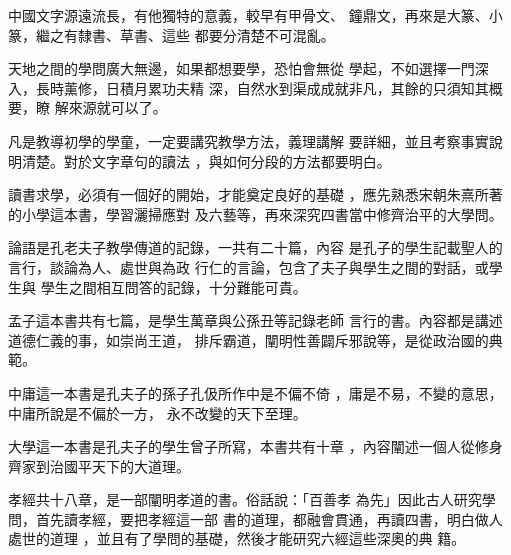\documentclass[avery5371,grid]{flashcards}
\begin{document}
{中國文字源遠流長，有他獨特的意義，較早有甲骨文、
鐘鼎文，再來是大篆、小篆，繼之有隸書、草書、這些
都要分清楚不可混亂。} %
{} %

{天地之間的學問廣大無邊，如果都想要學，恐怕會無從
學起，不如選擇一門深入，長時薰修，日積月累功夫精
深，自然水到渠成成就非凡，其餘的只須知其概要，瞭
解來源就可以了。} %
{} %

{凡是教導初學的學童，一定要講究教學方法，義理講解
要詳細，並且考察事實說明清楚。對於文字章句的讀法
，與如何分段的方法都要明白。} %
{} %

{讀書求學，必須有一個好的開始，才能奠定良好的基礎
，應先熟悉宋朝朱熹所著的小學這本書，學習灑掃應對
及六藝等，再來深究四書當中修齊治平的大學問。} %
{} %

{論語是孔老夫子教學傳道的記錄，一共有二十篇，內容
是孔子的學生記載聖人的言行，談論為人、處世與為政
行仁的言論，包含了夫子與學生之間的對話，或學生與
學生之間相互問答的記錄，十分難能可貴。} %
{} %





{孟子這本書共有七篇，是學生萬章與公孫丑等記錄老師
言行的書。內容都是講述道德仁義的事，如崇尚王道，
排斥霸道，闡明性善闢斥邪說等，是從政治國的典範。} %
{} %

{中庸這一本書是孔夫子的孫子孔伋所作中是不偏不倚
，庸是不易，不變的意思，中庸所說是不偏於一方，
永不改變的天下至理。} %
{} %

{大學這一本書是孔夫子的學生曾子所寫，本書共有十章
，內容闡述一個人從修身齊家到治國平天下的大道理。} %
{} %

{孝經共十八章，是一部闡明孝道的書。俗話說：「百善孝
為先」因此古人研究學問，首先讀孝經，要把孝經這一部
書的道理，都融會貫通，再讀四書，明白做人處世的道理
，並且有了學問的基礎，然後才能研究六經這些深奧的典
籍。} %
{} %
\end{document}
